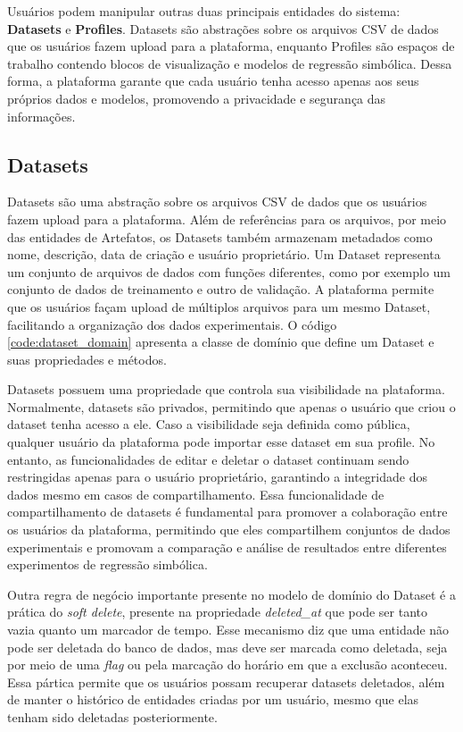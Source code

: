 Usuários podem manipular outras duas principais entidades do sistema: \textbf{Datasets} e \textbf{Profiles}. Datasets são abstrações sobre os arquivos CSV de dados que os usuários fazem upload para a plataforma, enquanto Profiles são espaços de trabalho contendo blocos de visualização e modelos de regressão simbólica. Dessa forma, a plataforma garante que cada usuário tenha acesso apenas aos seus próprios dados e modelos, promovendo a privacidade e segurança das informações.

\subsection{Datasets}
Datasets são uma abstração sobre os arquivos CSV de dados que os usuários fazem upload para a plataforma. Além de referências para os arquivos, por meio das entidades de Artefatos, os Datasets também armazenam metadados como nome, descrição, data de criação e usuário proprietário. Um Dataset representa um conjunto de arquivos de dados com funções diferentes, como por exemplo um conjunto de dados de treinamento e outro de validação. A plataforma permite que os usuários façam upload de múltiplos arquivos para um mesmo Dataset, facilitando a organização dos dados experimentais. O código \ref{code:dataset_domain} apresenta a classe de domínio que define um Dataset e suas propriedades e métodos.

Datasets possuem uma propriedade que controla sua visibilidade na plataforma. Normalmente, datasets são privados, permitindo que apenas o usuário que criou o dataset tenha acesso a ele. Caso a visibilidade seja definida como pública, qualquer usuário da plataforma pode importar esse dataset em sua profile. No entanto, as funcionalidades de editar e deletar o dataset continuam sendo restringidas apenas para o usuário proprietário, garantindo a integridade dos dados mesmo em casos de compartilhamento. Essa funcionalidade de compartilhamento de datasets é fundamental para promover a colaboração entre os usuários da plataforma, permitindo que eles compartilhem conjuntos de dados experimentais e promovam a comparação e análise de resultados entre diferentes experimentos de regressão simbólica.

Outra regra de negócio importante presente no modelo de domínio do Dataset é a prática do \textit{soft delete}, presente na propriedade \textit{deleted\_at} que pode ser tanto vazia quanto um marcador de tempo. Esse mecanismo diz que uma entidade não pode ser deletada do banco de dados, mas deve ser marcada como deletada, seja por meio de uma \textit{flag} ou pela marcação do horário em que a exclusão aconteceu. Essa pártica permite que os usuários possam recuperar datasets deletados, além de manter o histórico de entidades criadas por um usuário, mesmo que elas tenham sido deletadas posteriormente.

